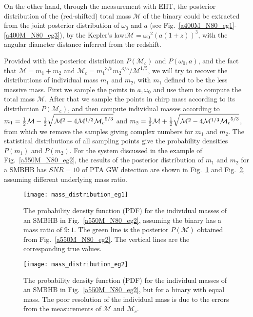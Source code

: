\documentclass[twocolumn]{aastex62}
\begin{document}
On the other hand, through the measurement with EHT,  the posterior distribution of the (red-shifted) total mass $\mathcal{M}$ of the binary could be extracted from the joint posterior distribution of $\omega_0$ and $a$ (see Fig.~\ref{a400M_N80_eg1}-\ref{a400M_N80_eg3}), by the Kepler's law:$\mathcal{M} = {\omega_0}^2 (a(1+z))^3$, with the angular diameter distance inferred from the redshift. 

Provided with the posterior distribution $P(\mathcal{M}_c)$ and $P(\omega_0,a)$, and the fact that $\mathcal{M}=m_1+m_2$ and $\mathcal{M}_c ={{m_1}^{3/5}{m_2}^{3/5}/{\mathcal{M}}^{1/5} }$, we will try to  recover the distributions of  individual mass $m_1$ and $m_2$, with $m_1$ defined to be the less massive mass. First we sample the points in $a, \omega_0$ and use them to compute the total mass $\mathcal{M}$. After that we sample the points in chirp mass according to its distribution $P(\mathcal{M}_c)$, and then compute individual masses
according to $m_1= {1\over 2}\mathcal{M}-{1\over 2}\sqrt{ {\mathcal{M}}^2 - 4 {\mathcal{M}}^{1/3} {\mathcal{M}_c}^{5/3} }$ and $m_2={1\over 2}\mathcal{M}+{1\over 2}\sqrt{ {\mathcal{M}}^2 - 4 {\mathcal{M}}^{1/3} {\mathcal{M}_c}^{5/3} }$, from which  we remove the samples giving complex numbers for $m_1$ and $m_2$.  The statistical distributions of all sampling points give the probability densities $P(m_1)$ and $P(m_2)$.  
For the system discussed in the example of Fig.~\ref{a550M_N80_eg2}, the results of the posterior distribution of $m_1$ and $m_2$ for a SMBHB has $SNR=10$ of PTA GW detection are shown in Fig.~\ref{mass_posterior_eg1} and Fig.~\ref{mass_posterior_eg2}, assuming different underlying mass ratio. 
%
%
\begin{figure}[h] %
\centering 
\texttt{[image: mass\_distribution\_eg1]} 
\caption{ The probability density function (PDF) for the individual masses of an SMBHB in Fig.~\ref{a550M_N80_eg2}, assuming the binary has a mass ratio of $9:1$. 
The green line is the posterior $P(\mathcal{M})$ obtained from Fig.~\ref{a550M_N80_eg2}. The vertical lines are the corresponding true values. 
   }
\label{mass_posterior_eg1}
\end{figure} 
%
\begin{figure}[h] %
\centering 
\texttt{[image: mass\_distribution\_eg2]} 
\caption{ The probability density function (PDF) for the individual masses of an SMBHB in Fig.~\ref{a550M_N80_eg2}, but for a binary with equal mass. The poor resolution of the individual mass is due to the errors from the measurements of $\mathcal{M}$ and ${\mathcal{M}}_c$. 
   }
\label{mass_posterior_eg2}
\end{figure} 
\end{document}
